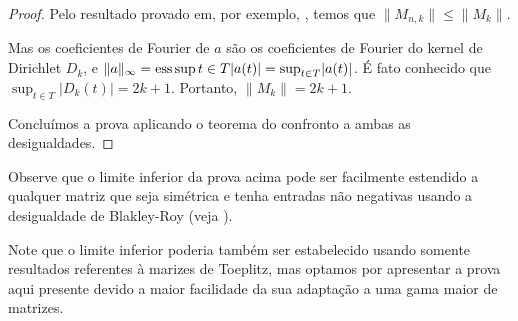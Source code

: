 \begin{proof}
  Pelo resultado provado em, por exemplo, \cite[p. 52]{bottcher}, temos que $\| M_{n,k} \| \le \| M_k \|$.

  Mas os coeficientes de Fourier de $a$ são os coeficientes de Fourier do kernel de Dirichlet $D_k$, e $\| a \|_{\infty} = \operatorname*{ess\,sup}{t \in T} \lvert a(t)\rvert = \sup_{t \in T} \lvert a(t)\rvert$. É fato conhecido que $\sup_{t \in T} \lvert D_k(t)\rvert = 2k + 1$. Portanto, $\| M_k \| = 2k + 1$.

  Concluímos a prova aplicando o teorema do confronto a ambas as desigualdades.
\end{proof}

Observe que o limite inferior da prova acima pode ser facilmente estendido a qualquer matriz que seja simétrica e tenha entradas não negativas usando a desigualdade de Blakley-Roy (veja \cite{blakley-roy}).

Note que o limite inferior poderia também ser estabelecido usando somente resultados referentes à marizes de Toeplitz, mas optamos por apresentar a prova aqui presente devido a maior facilidade da sua adaptação a uma gama maior de matrizes.
